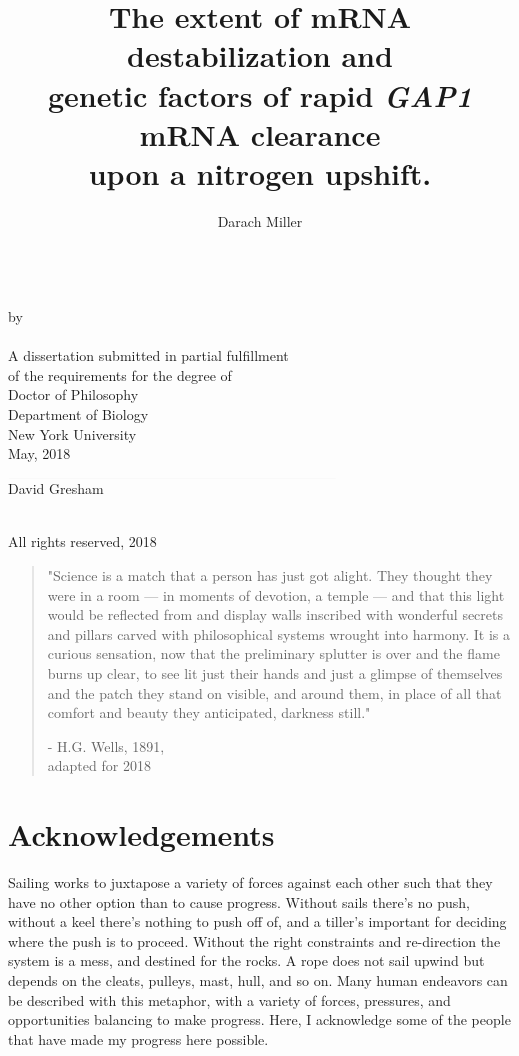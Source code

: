 \documentclass[12pt,letterpaper]{memoir}
\title{
The extent of mRNA destabilization and 
\\genetic factors of rapid \textit{GAP1} mRNA clearance 
\\upon a nitrogen upshift.
}
\author{Darach Miller}
\makeatletter
\def\makemytitle{
  \newpage
\begin{center}
\vfill
  \@title\\
\vfill
  by\\
\vfill
  \@author\\
\vfill
  A dissertation submitted in partial fulfillment \\
  of the requirements for the degree of \\
  Doctor of Philosophy \\
  Department of Biology \\
  New York University \\
  \monthz, \yearz\\
  \end{center}
\vfill
\begin{flushright}
  $\rule{3.25in}{0.01mm}$\\
  David Gresham
\end{flushright}
  \pagebreak
\begin{center}
  \textcopyright \hspace{0.2em} \@author \\
  All rights reserved, \yearz \\
\end{center}
  \pagebreak
}
\def\monthz{May}
\def\yearz{2018}
\makeatother
\begin{document}
\DoubleSpacing
\frontmatter
\pagestyle{empty}

\makemytitle

\iftrue
\begin{quote}
\SingleSpace
"Science is a match that a person has just got alight. 
They thought they were in a room --- 
in moments of devotion, a temple --- 
and that this light would be reflected from and display walls 
inscribed with wonderful secrets and pillars carved with 
philosophical systems wrought into harmony. 
\vfill
It is a curious sensation, now that the preliminary splutter is 
over and the flame burns up clear, to see lit just their hands and 
just a glimpse of themselves and the patch they stand on visible, and 
around them, in place of all that comfort and beauty they
anticipated, \vspace{0.5em} darkness still."

\hfill - H.G. Wells, 1891, \\\vspace{1em}\hfill adapted for 2018
\end{quote}
\fi

\newpage
\pagestyle{plain}

\section*{Acknowledgements}

\label{section:acknow}

Sailing works to juxtapose a variety of forces against 
each other such that they have no other option than to cause progress.
Without sails there's no push, without a keel there's nothing to push
off of, and a tiller's important for deciding where the push is to 
proceed.
Without the right constraints and re-direction the system is a 
mess, and destined for the rocks.
A rope does not sail upwind but depends on the cleats, pulleys,
mast, hull, and so on.
Many human endeavors can be described with 
this metaphor, with a variety of forces, pressures, and opportunities 
balancing to make progress.
Here, I acknowledge some of the people that have 
made my progress here possible.
\end{document}
